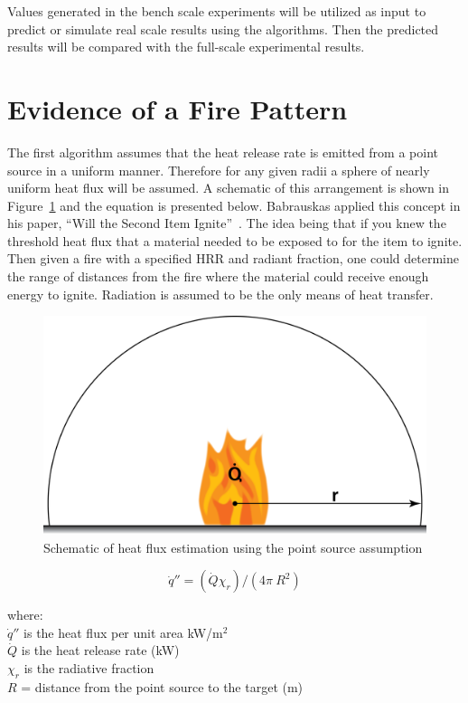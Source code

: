 \documentclass[twoside]{uocthesis}
\begin{document}
Values generated in the bench scale experiments will be utilized as input to predict or simulate real scale results using the algorithms.  Then the predicted results will be compared with the full-scale experimental results.  

\section{Evidence of a Fire Pattern}

The first algorithm assumes that the heat release rate is emitted from a point source in a uniform manner.  Therefore for any given radii a sphere of nearly uniform heat flux will be assumed. A schematic of this arrangement is shown in Figure~\ref{PointSourceHF} and the equation is presented below. Babrauskas applied this concept in his paper, ``Will the Second Item Ignite''~\cite{Babrauskas:1981}.  The idea being that if you knew the threshold heat flux that a material needed to be exposed to for the item to ignite.  Then given a fire with a specified HRR and radiant fraction, one could determine the range of distances from the fire where the material could receive enough energy to ignite.  Radiation is assumed to be the only means of heat transfer.       

\begin{figure}
	\centering
	\includegraphics[width=\textwidth]{../Figures/PointSourceHF}
	\caption{Schematic of heat flux estimation using the point source assumption}
	\label{PointSourceHF}
\end{figure}


\begin{equation} \label{eq:second_item}
\dot{q}'' = (\dot{Q} \chi_r)/(4 \pi\ R^2)
\end{equation}

\begin{tabbing}
where: \=  \\

\> $\dot{q}''$ is the heat flux per unit area kW/m$^2$\\
\> $\dot{Q}$ is the heat release rate (kW) \\ 
\> $\chi_r$ is the radiative fraction \\
\> $R$ = distance from the point source to the target (m) \\
\end{tabbing}
\end{document}
